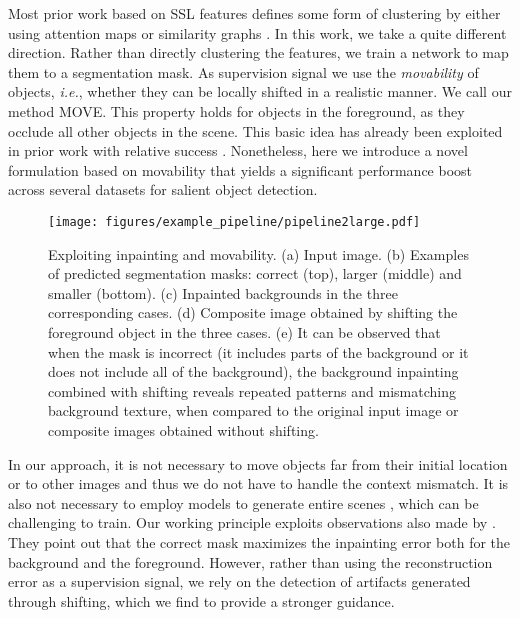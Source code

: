 \documentclass{article}
\newcommand\ie{\emph{i.e.}}
\newcommand\methodname{MOVE\xspace}
\begin{document}
Most prior work based on SSL features defines some form of clustering by either using attention maps \cite{amir2021deep,wang2022freesolo,yin2021transfgu} or similarity graphs \cite{LOST,wang2022self,Shin2022selfmask}.
In this work, we take a quite different direction. Rather than directly clustering the features, we train a network to map them to a segmentation mask. As supervision signal we use the \emph{movability} of objects, \ie, whether they can be locally shifted in a realistic manner. We call our method \methodname. This property holds for objects in the foreground, as they occlude all other objects in the scene. This basic idea has already been exploited in prior work with relative success \cite{Remez_2018_ECCV,Ostyakov2018,bielski2019emergence,arandjelovic2019object,yang_loquercio_2019,savarese2020information,katircioglu2021videobginpaint}. Nonetheless, here we introduce a novel formulation based on movability that yields a significant performance boost across several datasets for salient object detection.

\begin{figure*}[t]
  \centering
\texttt{[image: figures/example\_pipeline/pipeline2large.pdf]}
\caption{Exploiting inpainting and movability. (a) Input image. (b) Examples of predicted segmentation masks: correct (top), larger (middle) and smaller (bottom). (c) Inpainted backgrounds in the three corresponding cases. (d) Composite image obtained by shifting the foreground object in the three cases. (e) It can be observed that when the mask is incorrect (it includes parts of the background or it does not include all of the background), the background inpainting combined with shifting reveals repeated patterns and mismatching background texture, when compared to the original input image or composite images obtained without shifting.}\label{fig:shiftability}
\end{figure*}


In our approach, it is not necessary to move objects far from their initial location or to other images \cite{Ostyakov2018,arandjelovic2019object} and thus we do not have to handle the context mismatch. It is also not necessary to employ models to generate entire scenes \cite{bielski2019emergence,yang2017lr}, which can be challenging to train. Our working principle exploits observations also made by \cite{yang_loquercio_2019,savarese2020information,katircioglu2021videobginpaint}. They point out that the correct mask maximizes the inpainting error both for the background and the foreground. However, rather than using the reconstruction error as a supervision signal, we rely on the detection of artifacts generated through shifting, which we find to provide a stronger guidance.
\end{document}
